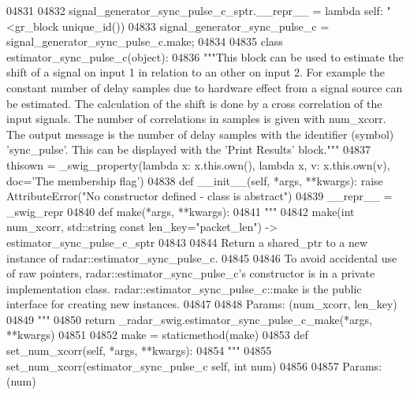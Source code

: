 \begin{DoxyCode}
{{{{{{{{{{{{{{{{04831 
04832 signal\_generator\_sync\_pulse\_c\_sptr.\_\_repr\_\_ = \textcolor{keyword}{lambda} self: \textcolor{stringliteral}{"<gr\_block %
      unique\_id())
04833 signal\_generator\_sync\_pulse\_c = signal\_generator\_sync\_pulse\_c.make;
04834 
04835 \textcolor{keyword}{class }estimator_sync_pulse_c(object):
04836     \textcolor{stringliteral}{"""This block can be used to estimate the shift of a signal on input 1 in relation to an other on input
       2. For example the constant number of delay samples due to hardware effect from a signal source can be
       estimated. The calculation of the shift is done by a cross correlation of the input signals. The number of
       correlations in samples is given with num\_xcorr. The output message is the number of delay samples with the
       identifier (symbol) 'sync\_pulse'. This can be displayed with the 'Print Results' block."""}
04837     thisown = _swig_property(\textcolor{keyword}{lambda} x: x.this.own(), \textcolor{keyword}{lambda} x, v: x.this.own(v), doc=\textcolor{stringliteral}{'The membership flag'})
04838     \textcolor{keyword}{def }__init__(self, *args, **kwargs): \textcolor{keywordflow}{raise} AttributeError(\textcolor{stringliteral}{"No constructor defined - class is abstract"})
04839     \_\_repr\_\_ = \_swig\_repr
04840     \textcolor{keyword}{def }make(*args, **kwargs):
04841         \textcolor{stringliteral}{"""}
04842 \textcolor{stringliteral}{        make(int num\_xcorr, std::string const len\_key="packet\_len") -> estimator\_sync\_pulse\_c\_sptr}
04843 \textcolor{stringliteral}{}
04844 \textcolor{stringliteral}{        Return a shared\_ptr to a new instance of radar::estimator\_sync\_pulse\_c.}
04845 \textcolor{stringliteral}{}
04846 \textcolor{stringliteral}{        To avoid accidental use of raw pointers, radar::estimator\_sync\_pulse\_c's constructor is in a
       private implementation class. radar::estimator\_sync\_pulse\_c::make is the public interface for creating new
       instances.}
04847 \textcolor{stringliteral}{}
04848 \textcolor{stringliteral}{        Params: (num\_xcorr, len\_key)}
04849 \textcolor{stringliteral}{        """}
04850         \textcolor{keywordflow}{return} \_radar\_swig.estimator\_sync\_pulse\_c\_make(*args, **kwargs)
04851 
04852     make = staticmethod(make)
04853     \textcolor{keyword}{def }set_num_xcorr(self, *args, **kwargs):
04854         \textcolor{stringliteral}{"""}
04855 \textcolor{stringliteral}{        set\_num\_xcorr(estimator\_sync\_pulse\_c self, int num)}
04856 \textcolor{stringliteral}{}
04857 \textcolor{stringliteral}{        Params: (num)}
}}}}}}}}}}}}}}}}}
\end{DoxyCode}
